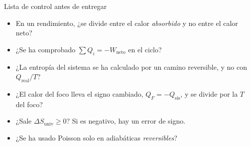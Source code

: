 \begin{recuadro}{Lista de control antes de entregar}
\begin{itemize}[label={\color{acento}$\blacktriangleright$},leftmargin=1.4em,itemsep=4pt]
\item En un rendimiento, ¿se divide entre el calor \emph{absorbido} y no entre el calor neto?
\item ¿Se ha comprobado $\sum Q_i=-W_{\mathrm{neto}}$ en el ciclo?
\item ¿La entropía del sistema se ha calculado por un camino reversible, y no con $Q_{\mathrm{real}}/T$?
\item ¿El calor del foco lleva el signo cambiado, $Q_F=-Q_{\mathrm{sis}}$, y se divide por la $T$ del foco?
\item ¿Sale $\Delta S_{\mathrm{univ}}\geq0$? Si es negativo, hay un error de signo.
\item ¿Se ha usado Poisson solo en adiabáticas \emph{reversibles}?
\end{itemize}
\end{recuadro}
